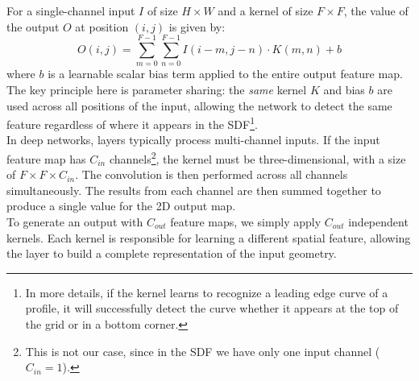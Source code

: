 For a single-channel input $I$ of size $H\times W$ and a kernel of size $F\times F$, the value of the output $O$ at position $(i,j)$ is given by:
\begin{equation}
    O(i,j)=\sum_{m=0}^{F-1}\sum_{n=0}^{F-1}I(i-m,j-n)\cdot K(m,n)+b
    \label{eq:convolutional_sum}
\end{equation}
where $b$ is a learnable scalar bias term applied to the entire output feature map.\\

The key principle here is parameter sharing: the \textit{same} kernel $K$ and bias $b$ are used across all positions of the input, allowing the network to detect the same feature regardless of where it appears in the SDF\footnote{In more details, if the kernel learns to recognize a leading edge curve of a profile, it will successfully detect the curve whether it appears at the top of the grid or in a bottom corner.}.\\

In deep networks, layers typically process multi-channel inputs. If the input feature map has $C_{in}$ channels\footnote{This is not our case, since in the SDF we have only one input channel ($C_{in}=1$).}, the kernel must be three-dimensional, with a size of $F\times F\times C_{in}$. The convolution is then performed across all channels simultaneously. The results from each channel are then summed together to produce a single value for the 2D output map.\\

To generate an output with $C_{out}$ feature maps, we simply apply $C_{out}$ independent kernels. Each kernel is responsible for learning a different spatial feature, allowing the layer to build a complete representation of the input geometry.\\

